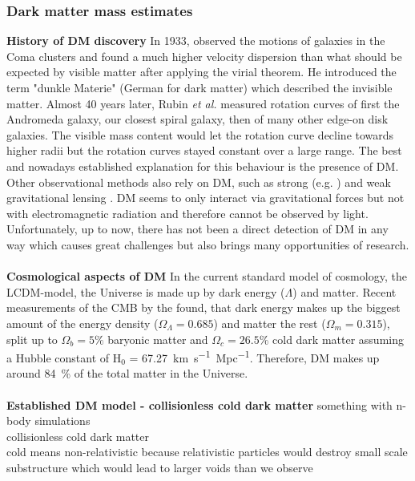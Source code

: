 \subsubsection{Dark matter mass estimates}
\textbf{History of \ac{DM} discovery} In 1933, \citeauthor{Zwicky...DM...1933} observed the motions of galaxies in the Coma clusters and found a much higher velocity dispersion than what should be expected by visible matter after applying the virial theorem. He introduced the term "dunkle Materie" (German for dark matter) which described the invisible matter. Almost 40 years later, Rubin \textit{et al.} \citeyearpar{Rubin...DM...1970, Rubin...DM...1978, Rubin...DM...1980} measured rotation curves of first the Andromeda galaxy, our closest spiral galaxy, then of many other edge-on disk galaxies. The visible mass content would let the rotation curve decline towards higher radii but the rotation curves stayed constant over a large range. The best and nowadays established explanation for this behaviour is the presence of \ac{DM}. Other observational methods also rely on \ac{DM}, such as strong (e.g. \citep{Trick..stronglensing...2016}) and weak gravitational lensing \citep{Tyson...weaklensing...1990, Kaiser...weaklensing...1993}. \ac{DM} seems to only interact via gravitational forces but not with electromagnetic radiation and therefore cannot be observed by light. Unfortunately, up to now, there has not been a direct detection of \ac{DM} in any way which causes great challenges but also brings many opportunities of research.\\
\\\textbf{Cosmological aspects of \ac{DM}}
In the current standard model of cosmology, the \ac{LCDM}-model, the Universe is made up by dark energy ($\Lambda$) and matter. Recent measurements of the \ac{CMB} by the \citet{Planck...CMB...2018} found, that dark energy makes up the biggest amount of the energy density ($\Omega_\Lambda = 0.685$) and matter the rest ($\Omega_m = 0.315$), split up to $\Omega_b = 5\%$ baryonic matter and $\Omega_c = 26.5\%$ cold dark matter assuming a Hubble constant of H$_0$ =  \SI{67.27}{km.s^{-1}.Mpc^{-1}}. 
Therefore, \ac{DM} makes up around \SI{84}{\%} of the total matter in the Universe. \\
\\\textbf{Established \ac{DM} model - collisionless cold dark matter}
 something with n-body simulations\\
collisionless cold dark matter\\
cold means non-relativistic because relativistic particles would destroy small scale substructure which would lead to larger voids than we observe\\
